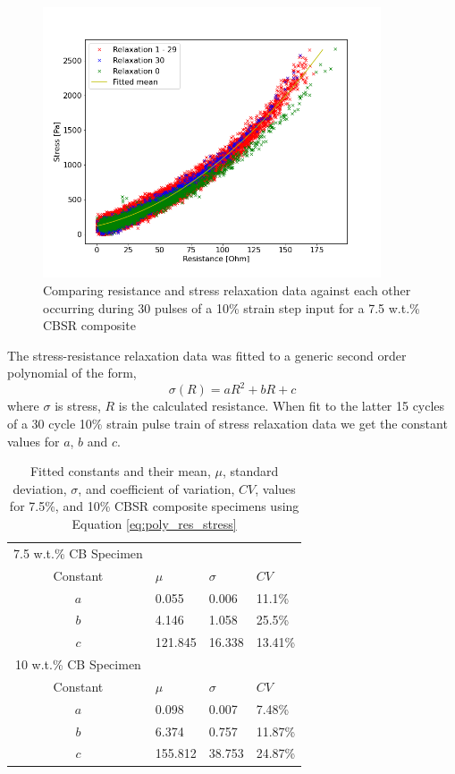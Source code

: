 \begin{figure}[H]
	\centering
	\includegraphics[width=10cm]{Figures/relax_res_stress_non_lin_rgby_MAF8_2_7-5_Epin_20mm_v3.png}
	\caption{Comparing resistance and stress relaxation data against each other occurring during 30 pulses of a 10\% strain step input for a 7.5 w.t.\% CBSR composite}
	\label{fig:res_vs_stress_30pulses}
\end{figure}
The stress-resistance relaxation data was fitted to a generic second order polynomial of the form, 
\begin{equation}
	\sigma(R) = aR^2+bR+c
	\label{eq:poly_res_stress}
\end{equation}
where $\sigma$ is stress, $R$ is the calculated resistance. When fit to the latter 15 cycles of a 30 cycle 10\% strain pulse train of stress relaxation data we get the constant values for $a$, $b$ and $c$.
\begin{table}[H]
	\caption{Fitted constants and their mean, $\mu$, standard deviation, $\sigma$, and coefficient of variation, $CV$, values for 7.5\%, and 10\% CBSR composite specimens using Equation \ref{eq:poly_res_stress}}
	\begin{center}
		\label{tab:generalised_model_constants}
		\begin{tabular}{c l l l}
			7.5 w.t.\% CB Specimen \\
			Constant & $\mu$ & $\sigma$ & $CV$ \\
			\hline
			$a$ & 0.055 & 0.006 & 11.1\% \\
			$b$ & 4.146 & 1.058 & 25.5\% \\
			$c$ & 121.845 & 16.338 & 13.41\% \\
			\hline
			10 w.t.\% CB Specimen \\
			Constant & $\mu$ & $\sigma$ & $CV$ \\
			\hline
			$a$ & 0.098 & 0.007 & 7.48\% \\
			$b$ & 6.374 & 0.757 & 11.87\% \\
			$c$ & 155.812 & 38.753 & 24.87\% \\
			\hline
		\end{tabular}
	\end{center}
\end{table}


